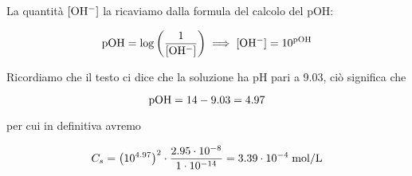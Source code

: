 La quantità $\rm [OH^-]$ la ricaviamo dalla formula del calcolo del pOH:

\begin{equation*}
    \rm pOH=\log \left( \frac{1}{[OH^-]} \right)
    \implies
    [OH^-]=10^{pOH}
\end{equation*}

Ricordiamo che il testo ci dice che la soluzione ha pH pari a 9.03, ciò significa che

\begin{equation*}
    \rm pOH=14-9.03=4.97
\end{equation*}

per cui in definitiva avremo

\begin{equation*}
    C_s
    ={\big( 10^{4.97} \big)}^2 \cdot \frac{2.95 \cdot 10^{-8}}{1 \cdot 10^{-14}}
    =3.39 \cdot 10^{-4} \; \rm mol/L
\end{equation*}